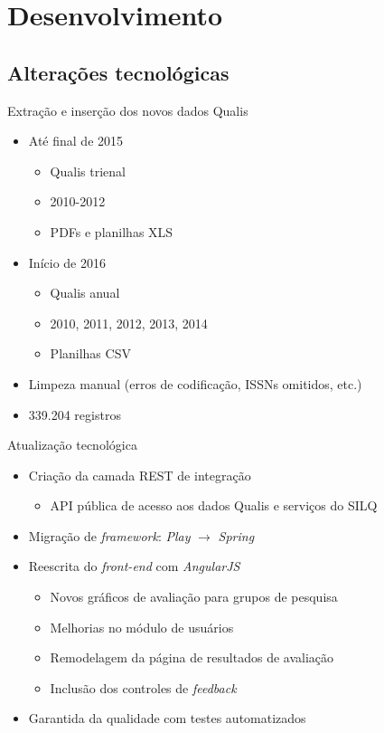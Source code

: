 \documentclass{beamer}
\begin{document}
\section{Desenvolvimento}

\subsection{Alterações tecnológicas}

\begin{frame}{Extração e inserção dos novos dados Qualis}
  \begin{itemize}
    \item Até final de 2015
    \begin{itemize}
      \item Qualis trienal
      \item 2010-2012
      \item PDFs e planilhas XLS
    \end{itemize}

    \item Início de 2016
      \begin{itemize}
        \item Qualis anual
        \item 2010, 2011, 2012, 2013, 2014
        \item Planilhas CSV
      \end{itemize}

    \item Limpeza manual (erros de codificação, ISSNs omitidos, etc.)
    \item 339.204 registros
  \end{itemize}
\end{frame}

\begin{frame}{Atualização tecnológica}
  \begin{itemize}
    \item Criação da camada REST de integração
    \begin{itemize}
      \item API pública de acesso aos dados Qualis e serviços do SILQ
    \end{itemize}
    \item Migração de \textit{framework}: \textit{Play} $\rightarrow$ \textit{Spring}
    \item Reescrita do \textit{front-end} com \textit{AngularJS}
    \begin{itemize}
      \item Novos gráficos de avaliação para grupos de pesquisa
      \item Melhorias no módulo de usuários
      \item Remodelagem da página de resultados de avaliação
      \item Inclusão dos controles de \textit{feedback}
    \end{itemize}
    \item Garantida da qualidade com testes automatizados
  \end{itemize}
\end{frame}
\end{document}
